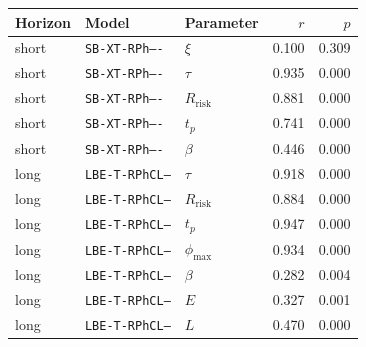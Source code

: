 \begin{tabular}{lllrr}
\toprule
Horizon & Model & Parameter & $r$ & $p$ \\
\midrule
short & \texttt{SB-XT-RPh----} & $\xi$ & 0.100 & 0.309 \\
short & \texttt{SB-XT-RPh----} & $\tau$ & 0.935 & 0.000 \\
short & \texttt{SB-XT-RPh----} & $R_{\mathrm{risk}}$ & 0.881 & 0.000 \\
short & \texttt{SB-XT-RPh----} & $t_p$ & 0.741 & 0.000 \\
short & \texttt{SB-XT-RPh----} & $\beta$ & 0.446 & 0.000 \\
long & \texttt{LBE-T-RPhCL--} & $\tau$ & 0.918 & 0.000 \\
long & \texttt{LBE-T-RPhCL--} & $R_{\mathrm{risk}}$ & 0.884 & 0.000 \\
long & \texttt{LBE-T-RPhCL--} & $t_p$ & 0.947 & 0.000 \\
long & \texttt{LBE-T-RPhCL--} & $\phi_{\max}$ & 0.934 & 0.000 \\
long & \texttt{LBE-T-RPhCL--} & $\beta$ & 0.282 & 0.004 \\
long & \texttt{LBE-T-RPhCL--} & $E$ & 0.327 & 0.001 \\
long & \texttt{LBE-T-RPhCL--} & $L$ & 0.470 & 0.000 \\
\bottomrule
\end{tabular}
